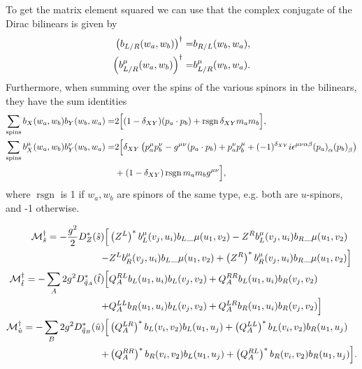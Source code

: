 \documentclass[../main.tex]{subfiles}
\begin{document}
To get the matrix element squared we can use that the complex conjugate of the
Dirac bilinears is given by
\begin{subequations}
	\begin{align}
		\left(b_{L/R}(w_a, w_b)\right)^\dagger =     & b_{R/L}(w_b, w_a),
		\\
		\left(b_{L/R}^\mu(w_a, w_b)\right)^\dagger = & b_{L/R}^\mu(w_b,
		w_a).
	\end{align}
\end{subequations}
Furthermore, when summing over the spins of the various spinors in the
bilinears, they have the sum identities
\begin{align}
	\sum_{\text{spins}} b_X(w_a, w_b) b_Y(w_b, w_a) =         & 2 \Big[
		(1-\delta_{XY}) (p_a \cdot p_b) + \operatorname{rsgn}
		\delta_{XY} m_a m_b
		\Big],
	\\
	\nonumber
	\sum_{\text{spins}} b_X^\mu(w_a, w_b) b_Y^\nu(w_b, w_a) = & 2\Big[
	\delta_{XY}\pclosed{p_a^\mu p_b^\nu - \g (p_a \cdot p_b) + p_a^\nu
		p_b^\mu +
		(-1)^{\delta_{XY}} i \epsilon^{\mu\nu\alpha\beta}
		\tensor{(p_a)}{_\alpha}
	\tensor{(p_b)}{_\beta}}                                             \\
	                                                          & +
	(1-\delta_{XY})\operatorname{rsgn} m_a m_b \g \Big],
\end{align}
where \(\operatorname{rsgn}\) is 1 if \(w_a, w_b\) are spinors of the same
type, e.g. both are \(u\)-spinors, and -1 otherwise.

\begin{temporary}

	\begin{subequations}
		\begin{align}
			\nonumber
			\mathcal{M}^\dagger_{\hat{s}} = -\frac{g^2}{2} D_Z^\ast(\hat{s})
			\Big[                               &
			\left(Z^L\right)^\ast b_L^\mu(v_j, u_i){b_L}\_{\mu}(u_1,
			v_2) -
			Z^R b_L^\mu(v_j, u_i){b_R}\_{\mu}(u_1, v_2)
			\\
			-
			                                    & Z^L b_R^\mu(v_j,
			u_i){b_L}\_{\mu}(u_1, v_2) +
			\left(Z^R\right)^\ast b_R^\mu(v_j, u_i){b_R}\_{\mu}(u_1,
			v_2) \Big]
			\\
			\nonumber
			\mathcal{M}^\dagger_{\hat{t}} = -\sum_A 2g^2
			D^\ast_{\tilde{q}_A}(\hat{t}) \Big[ & Q_A^{RL} b_L(u_1,
			u_i) b_L(v_j, v_2) +
			Q_A^{RR} b_L(u_1, u_i) b_R(v_j, v_2)
			\\
			+
			                                    & Q_A^{LL} b_R(u_1,
			u_i) b_L(v_j, v_2) + Q_A^{LR} b_R(u_1, u_i)
			b_R(v_j, v_2) \Big]
			\\
			\nonumber
			\mathcal{M}^\dagger_{\hat{u}} = -\sum_B 2g^2
			D^\ast_{\tilde{q}_B}(\hat{u}) \Big[ &
			\left(Q_A^{LR}\right)^\ast b_L(v_i, v_2)
			b_L(u_1, u_j) + \left(Q_A^{LL}\right)^\ast b_L(v_i, v_2)
			b_R(u_1, u_j)
			\\
			+
			                                    &
			\left(Q_A^{RR}\right)^\ast b_R(v_i, v_2) b_L(u_1, u_j) +
			\left(Q_A^{RL}\right)^\ast b_R(v_i, v_2) b_R(u_1, u_j)
			\Big].
		\end{align}
	\end{subequations}

\end{temporary}
\end{document}
